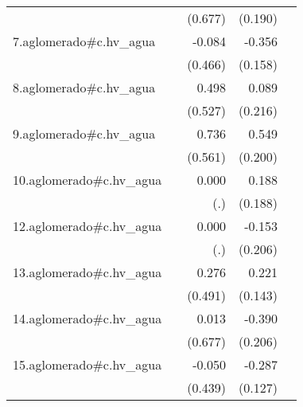 {\begin{longtable}{l*{4}{D{.}{.}{-1}}}
            &                     &     (0.677)         &     (0.190)         &                     \\
\addlinespace
7.aglomerado#c.hv\_agua&                     &      -0.084         &      -0.356\sym{*}  &                     \\
            &                     &     (0.466)         &     (0.158)         &                     \\
\addlinespace
8.aglomerado#c.hv\_agua&                     &       0.498         &       0.089         &                     \\
            &                     &     (0.527)         &     (0.216)         &                     \\
\addlinespace
9.aglomerado#c.hv\_agua&                     &       0.736         &       0.549\sym{**} &                     \\
            &                     &     (0.561)         &     (0.200)         &                     \\
\addlinespace
10.aglomerado#c.hv\_agua&                     &       0.000         &       0.188         &                     \\
            &                     &         (.)         &     (0.188)         &                     \\
\addlinespace
12.aglomerado#c.hv\_agua&                     &       0.000         &      -0.153         &                     \\
            &                     &         (.)         &     (0.206)         &                     \\
\addlinespace
13.aglomerado#c.hv\_agua&                     &       0.276         &       0.221         &                     \\
            &                     &     (0.491)         &     (0.143)         &                     \\
\addlinespace
14.aglomerado#c.hv\_agua&                     &       0.013         &      -0.390         &                     \\
            &                     &     (0.677)         &     (0.206)         &                     \\
\addlinespace
15.aglomerado#c.hv\_agua&                     &      -0.050         &      -0.287\sym{*}  &                     \\
            &                     &     (0.439)         &     (0.127)         &                     \\

\end{longtable}}
